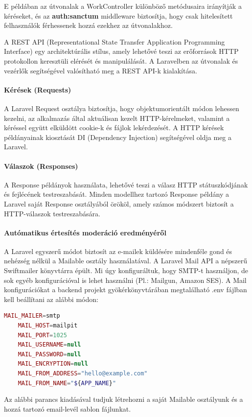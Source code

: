 E példában az útvonalak a WorkController különböző metódusaira irányítják a kéréseket, és az \textbf{auth:sanctum} middleware biztosítja, hogy csak hitelesített felhasználók férhessenek hozzá ezekhez az útvonalakhoz.

A REST API (Representational State Transfer Application Programming Interface) egy architektúrális stílus, amely lehetővé teszi az erőforrások HTTP protokollon keresztüli elérését és manipulálását. A Laravelben az útvonalak és vezérlők segítségével valósítható meg a REST API-k kialakítása.


\paragraph{Kérések (Requests)}
A Laravel Request osztálya biztosítja, hogy objektumorientált módon lehessen kezelni, az alkalmazás által aktuálisan kezelt HTTP-kérelmeket, valamint a kéréssel együtt elküldött cookie-k és fájlok lekérdezését. A HTTP kérések példányainak kiosztását DI (Dependency Injection) segítségével oldja meg a Laravel.

\paragraph{Válaszok (Responses)}
A Response példányok használata, lehetővé teszi a válasz HTTP státuszkódjának és fejlécének testreszabását. Minden modellhez tartozó Response példány a Laravel saját Response osztályából örököl, amely számos módszert biztosít a HTTP-válaszok testreszabására.


\paragraph{Autómatikus értesítés moderáció eredményéről}
A Laravel egyszerű módot biztosít az e-mailek küldésére mindenféle gond és nehézség nélkül a Mailable osztály használatával.
A Laravel Mail API a népszerű Swiftmailer könyvtárra épült. Mi úgy konfiguráltuk, hogy SMTP-t használjon, de sok egyéb konfigurációval is lehet használni (Pl.: Mailgun, Amazon SES).
A Mail konfigurációkat a backend projekt gyökérkönyvtárában megtalálható .env fájlban kell beállítani az alábbi módon:
\begin{lstlisting}[language=php]
    MAIL_MAILER=smtp
    MAIL_HOST=mailpit
    MAIL_PORT=1025
    MAIL_USERNAME=null
    MAIL_PASSWORD=null
    MAIL_ENCRYPTION=null
    MAIL_FROM_ADDRESS="hello@example.com"
    MAIL_FROM_NAME="${APP_NAME}"
\end{lstlisting}
Az alábbi parancs kiadásával tudjuk létrehozni a saját Mailable osztályunk és a hozzá tartozó email-levél sablon fájlunkat.


